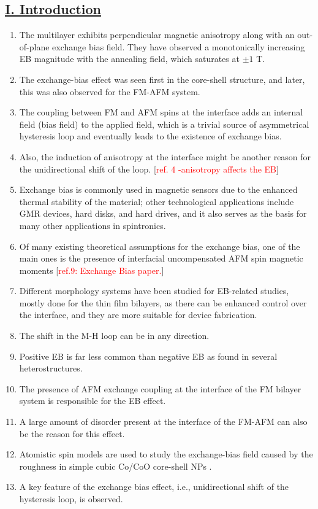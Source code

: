 \subsection*{\underline{I. Introduction}}
\begin{enumerate}
    \item The multilayer exhibits perpendicular magnetic anisotropy along with an out-of-plane exchange bias field. They have observed a monotonically increasing EB magnitude with the annealing field, which saturates at $\pm1$ T.
    \item The exchange-bias effect was seen first in the core-shell structure, and later, this was also observed for the FM-AFM system.
    \item The coupling between FM and AFM spins at the interface adds an internal field (bias field) to the applied field, which is a trivial source of asymmetrical hysteresis loop and eventually leads to the existence of exchange bias. 
    \item Also, the induction of anisotropy at the interface might be another reason for the unidirectional shift of the loop. [\textcolor{red}{ref. 4 -anisotropy affects the EB}]
    \item Exchange bias is commonly used in magnetic sensors due to the enhanced thermal stability of the material; other technological applications include GMR devices, hard disks, and hard drives, and it also serves as the basis for many other applications in spintronics.
    \item Of many existing theoretical assumptions for the exchange bias, one of the main ones is the presence of interfacial uncompensated AFM spin magnetic moments [\textcolor{red}{ref.9: Exchange Bias paper.}]
    \item Different morphology systems have been studied for EB-related studies, mostly done for the thin film bilayers, as there can be enhanced control over the interface, and they are more suitable for device fabrication.
    \item The shift in the M-H loop can be in any direction.
    \item Positive EB is far less common than negative EB as found in several heterostructures.
    \item The presence of AFM exchange coupling at the interface of the FM bilayer system is responsible for the EB effect. 
    \item A large amount of disorder present at the interface of the FM-AFM can also be the reason for this effect.
    \item Atomistic spin models are used to study the exchange-bias field caused by the roughness in simple cubic Co/CoO core-shell NPs \cite{wuInfluenceAtomicRoughness2020,influenceofinterfacial2011}. 
    \item A key feature of the exchange bias effect, i.e., unidirectional shift of the hysteresis loop, is observed.
\end{enumerate}

